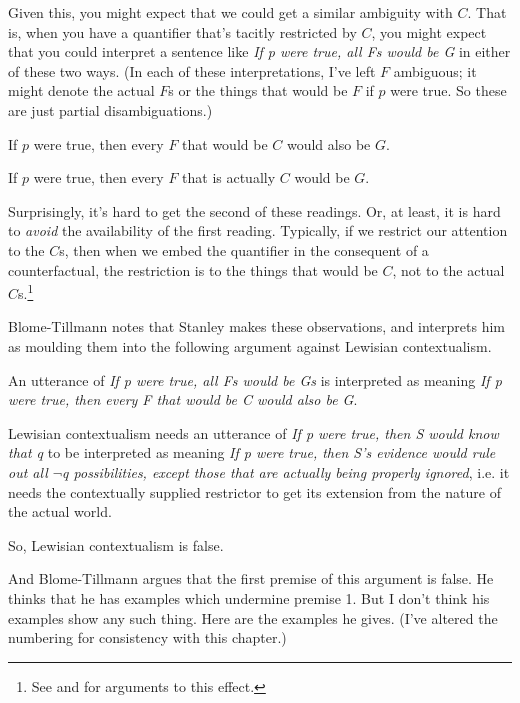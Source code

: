 \noindent Given this, you might expect that we could get a similar ambiguity with \(C\). That is, when you have a quantifier that's tacitly restricted by \(C\), you might expect that you could interpret a sentence like \textit{If p were true, all Fs would be G} in either of these two ways. (In each of these interpretations, I've left \(F\) ambiguous; it might denote the actual \(F\)s or the things that would be \(F\) if \(p\) were true. So these are just partial disambiguations.)

\begin{itemize*}
\item If \(p\) were true, then every \(F\) that would be \(C\) would also be \(G\).
\item If \(p\) were true, then every \(F\) that is actually \(C\) would be \(G\).
\end{itemize*}

\noindent Surprisingly, it's hard to get the second of these readings. Or, at least, it is hard to \textit{avoid} the availability of the first reading. Typically, if we restrict our attention to the \(C\)s, then when we embed the quantifier in the consequent of a counterfactual, the restriction is to the things that would be \(C\), not to the actual \(C\)s.\footnote{See \cite{Stanley2000-STAOQD} and \cite{Stanley2005-STAKAP} for arguments to this effect.} 

Blome-Tillmann notes that Stanley makes these observations, and interprets him as moulding them into the following argument against Lewisian contextualism.

\begin{enumerate*}
\item An utterance of \textit{If p were true, all Fs would be Gs} is interpreted as meaning \textit{If p were true, then every F that would be C would also be G}.
\item Lewisian contextualism needs an utterance of \textit{If p were true, then S would know that q} to be interpreted as meaning \textit{If p were true, then S's evidence would rule out all $\neg$q possibilities, except those that are actually being properly ignored}, i.e. it needs the contextually supplied restrictor to get its extension from the nature of the actual world.
\item So, Lewisian contextualism is false.
\end{enumerate*}

\noindent And Blome-Tillmann argues that the first premise of this argument is false. He thinks that he has examples which undermine premise 1. But I don't think his examples show any such thing. Here are the examples he gives. (I've altered the numbering for consistency with this chapter.)

